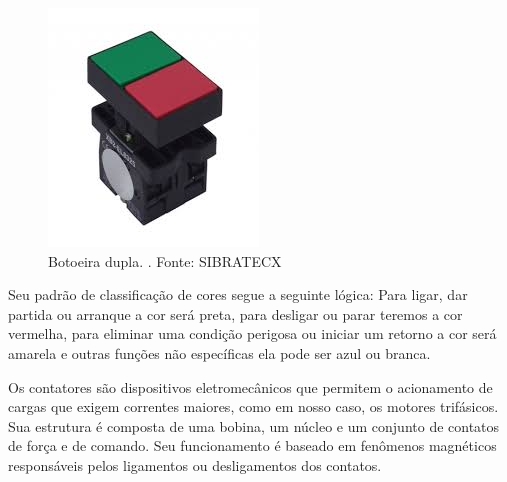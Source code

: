 \documentclass[a4paper, 12pt,oneside, english, brazil]{abntex2}
\begin{document}
\begin{figure}[H]
    \centering
    \includegraphics[scale=0.45]{botoeira.jpg}
    \caption{Botoeira dupla.
. Fonte: SIBRATECX}
    \label{botr}
\end{figure}

Seu padrão de classificação de cores segue a seguinte lógica:
Para ligar, dar partida ou arranque a cor será preta, para desligar ou parar teremos a cor vermelha, para eliminar uma condição perigosa ou iniciar um retorno a cor será amarela e outras funções não específicas ela pode ser azul ou branca.

Os contatores são dispositivos eletromecânicos que permitem o acionamento de cargas que exigem correntes maiores, como em nosso caso, os motores trifásicos. Sua estrutura é composta de uma bobina, um núcleo e um conjunto de contatos de força e de comando. Seu funcionamento é baseado em fenômenos magnéticos responsáveis pelos ligamentos ou desligamentos dos contatos.
\end{document}
